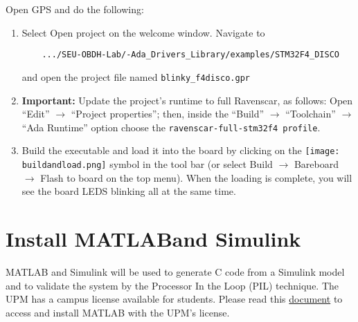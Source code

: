 Open GPS and do the following:
\begin{enumerate}
\item Select Open project on the welcome window. Navigate to

\begin{BVerbatim}
	.../SEU-OBDH-Lab/-Ada_Drivers_Library/examples/STM32F4_DISCO
\end{BVerbatim}

and open the project file named \texttt{blinky\_f4disco.gpr}

\item   \textbf{\textcolor{mRedBrown}{Important:}} Update the project's runtime to full Ravenscar, as follows: Open ``Edit'' $\rightarrow$ ``Project properties''; then, inside the ``Build'' $\rightarrow$ ``Toolchain'' $\rightarrow$ ``Ada Runtime'' option choose the \texttt{ravenscar-full-stm32f4 profile}.

\item	Build the executable and load it into the board by clicking on the \hbox{\texttt{[image: buildandload.png]}} symbol in the tool bar (or select Build $\rightarrow$ Bareboard $\rightarrow$ Flash to board on the top menu). When the loading is complete, you will see the board LEDS blinking all at the same time.
\end{enumerate}

\section{Install MATLAB\texttrademark and Simulink\texttrademark}

MATLAB and Simulink will be used to generate C code from a Simulink model and 
to validate the system by the Processor In the Loop (PIL) technique. The UPM has a campus license available for students.
Please read this \href{https://www.upm.es/sfs/Rectorado/Vicerrectorado\%20de\%20Tecnologias\%20de\%20la\%20Informacion\%20y\%20Servicios\%20en\%20Red/Servicio\%20de\%20Planificacion\%20Informatica\%20y\%20Comunicaciones/SW/MATLAB\_UPM\_Estudiantes.pdf}{document} to access and install MATLAB with the UPM's license.

